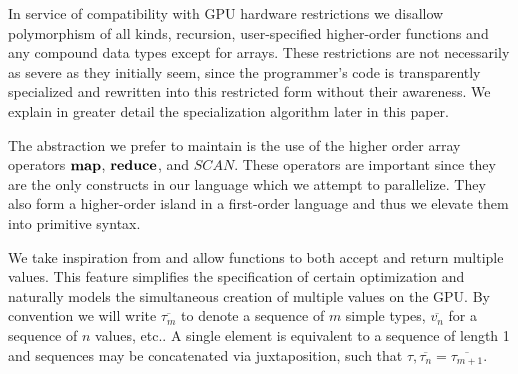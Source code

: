 \documentclass[preprint]{sigplanconf}
\begin{document}
In service of compatibility with GPU hardware restrictions we disallow polymorphism of all kinds, recursion, user-specified higher-order functions and any compound data types except for arrays. These restrictions are not necessarily as severe as they initially seem, since the programmer's code is transparently specialized and rewritten into this restricted form without their awareness. We explain in greater detail the specialization algorithm later in this paper.

The abstraction we prefer to maintain is the use of the higher order array operators $\mbox{\textbf{map}}$, $\mbox{\textbf{reduce}}$, and $SCAN$. These operators are important since they are 
the only constructs in our language which we attempt to parallelize. They also form a higher-order island in a first-order language and thus we elevate them into primitive syntax. 

We take inspiration from \cite{Bol09} and allow functions to both accept and return multiple values. This feature simplifies the specification of certain optimization and naturally models the simultaneous creation of multiple values on the GPU. By convention we will write $\overline{\tau_m}$ to denote a sequence of $m$ simple types, $\overline{v_n}$ for a sequence  of $n$ values, etc.. A single element is equivalent to a sequence of length 1 and sequences may be concatenated via juxtaposition, such that $\tau, \overline{\tau_n} = \overline{\tau_{m+1}}$. 
\end{document}
